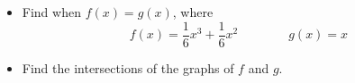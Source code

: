 \begin{frame}
\begin{example}
\begin{itemize}
\item Find when $f(x)=g(x)$, where 
\[
f(x)=\frac{1}{6}x^3+\frac{1}{6}x^2\qquad \qquad g(x)=x
\]
\item Find the intersections of the graphs of $f$ and $g$.
\end{itemize}
\end{example}
\end{frame}
